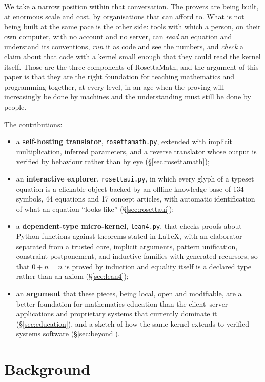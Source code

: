 \documentclass[11pt]{article}
\begin{document}
We take a narrow position within that conversation. The provers are being built,
at enormous scale and cost, by organisations that can afford to. What is not
being built at the same pace is the other side: tools with which a person, on
their own computer, with no account and no server, can \emph{read} an equation
and understand its conventions, \emph{run} it as code and see the numbers, and
\emph{check} a claim about that code with a kernel small enough that they could
read the kernel itself. Those are the three components of RosettaMath, and the
argument of this paper is that they are the right foundation for teaching
mathematics and programming together, at every level, in an age when the
proving will increasingly be done by machines and the understanding must still
be done by people.

\medskip
\noindent The contributions:
\begin{itemize}
\item a \textbf{self-hosting translator}, \texttt{rosettamath.py}, extended with implicit multiplication,
inferred parameters, and a reverse translator whose output is verified by
behaviour rather than by eye (\S\ref{sec:rosettamath});
\item an \textbf{interactive explorer}, \texttt{rosettaui.py}, in which every
glyph of a typeset equation is a clickable object backed by an offline
knowledge base of 134 symbols, 44 equations and 17 concept articles, with
automatic identification of what an equation ``looks like'' (\S\ref{sec:rosettaui});
\item a \textbf{dependent-type micro-kernel}, \texttt{lean4.py}, that checks
proofs about Python functions against theorems stated in \LaTeX{}, with an
elaborator separated from a trusted core, implicit arguments, pattern
unification, constraint postponement, and inductive families with generated
recursors, so that $0 + n = n$ is proved by induction and equality itself is a
declared type rather than an axiom (\S\ref{sec:lean4});
\item an \textbf{argument} that these pieces, being local, open and modifiable,
are a better foundation for mathematics education than the client--server
applications and proprietary systems that currently dominate it
(\S\ref{sec:education}), and a sketch of how the same kernel extends to verified
systems software (\S\ref{sec:beyond}).
\end{itemize}

\section{Background}
\end{document}
